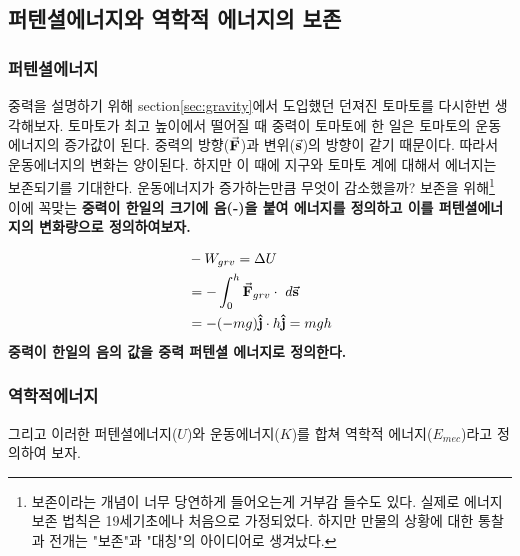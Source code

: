 \begin{flushleft}



\newpage
\subsection{퍼텐셜에너지와 역학적 에너지의 보존}
\subsubsection*{퍼텐셜에너지}
 중력을 설명하기 위해 section\ref{sec:gravity}에서 도입했던 던져진 토마토를 다시한번 생각해보자. 토마토가 최고 높이에서 떨어질 때 
 중력이 토마토에 한 일은 토마토의 운동에너지의 증가값이 된다. 중력의 방향($\va{F}$)과 변위($\va{s}$)의 방향이 같기 때문이다. 
 따라서 운동에너지의 변화는 양이된다.
하지만 이 때에 지구와 토마토 계에 대해서 에너지는 보존되기를 기대한다. 운동에너지가 증가하는만큼 무엇이 감소했을까? 
보존을 위해\footnote{보존이라는 개념이 너무 당연하게 들어오는게 거부감 들수도 있다. 실제로 에너지 보존 법칙은 19세기초에나 처음으로 가정되었다. 하지만 만물의 상황에 대한 통찰과 전개는 "보존"과 "대칭"의 아이디어로 생겨났다.} 
이에 꼭맞는 \textbf{중력이 한일의 크기에 음(-)을 붙여 에너지를 정의하고 이를 퍼텐셜에너지의 변화량으로 정의하여보자.}


  \begin{defn}
  \begin{align}
 & -W_{grv}= \Delta U\\
 & =- \int_{0}^{h} \va{F}_{grv} \cdot\ d \va{s}\\
 & = -(-mg)\vu{j} \cdot h\vu{j} =mgh  
\end{align}
\centering 
\textbf{중력이 한일의 음의 값을 중력 퍼텐셜 에너지로 정의한다.}
\end{defn}


\subsubsection{역학적에너지}
그리고 이러한 퍼텐셜에너지($U$)와 운동에너지($K$)를 합쳐 역학적 에너지($E_{mec}$)라고 정의하여 보자. 


\end{flushleft}
